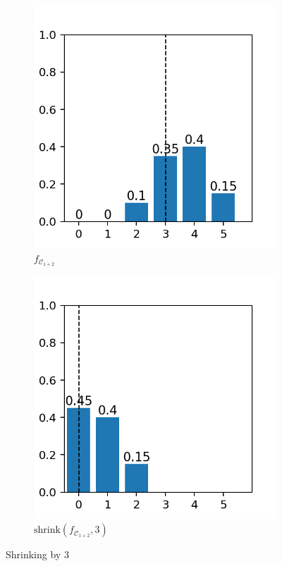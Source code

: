 \documentclass[a4paper,oneside]{csthesis}
\begin{document}
\begin{figure}[h]
\centering
    \begin{subfigure}[c]{0.4\textwidth}
        \includegraphics[width=\textwidth]{figures/ex_convolve_line.png}
        \caption{$f_{\mathcal{C}_{1+2}}$}\label{}
    \end{subfigure}
    \quad
    \begin{subfigure}[c]{0.4\textwidth}
        \includegraphics[width=\textwidth]{figures/ex_shrink.png}
        \caption{$\text{shrink}(f_{\mathcal{C}_{1+2}}, 3)$}\label{}
    \end{subfigure}
    \caption{Shrinking by 3}\label{fig:shrink}
\end{figure}
\end{document}
